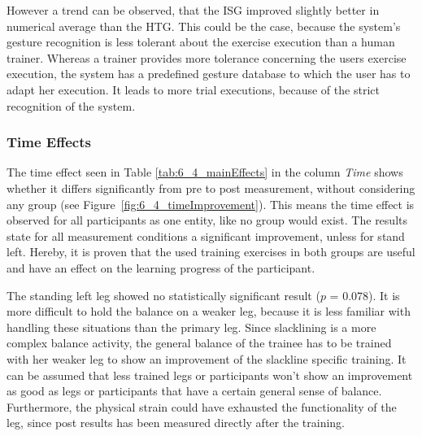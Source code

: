 
However a trend can be observed, that the ISG improved slightly better in numerical average than the HTG.
This could be the case, because the system's gesture recognition is less tolerant about the exercise execution than a human trainer.
Whereas a trainer provides more tolerance concerning the users exercise execution, the system has a predefined gesture database to which the user has to adapt her execution.
It leads to more trial executions, because of the strict recognition of the system.

\subsubsection{Time Effects}
The time effect seen in Table \ref{tab:6_4_mainEffects} in the column \textit{Time} shows whether it differs significantly from pre to post measurement, without considering any group (see Figure~\ref{fig:6_4_timeImprovement}).
This means the time effect is observed for all participants as one entity, like no group would exist.
The results state for all measurement conditions a significant improvement, unless for stand left.
Hereby, it is proven that the used training exercises in both groups are useful and have an effect on the learning progress of the participant.

The standing left leg showed no statistically significant result ($p$ = 0.078).
It is more difficult to hold the balance on a weaker leg, because it is less familiar with handling these situations than the primary leg.
Since slacklining is a more complex balance activity, the general balance of the trainee has to be trained with her weaker leg to show an improvement of the slackline specific training.
It can be assumed that less trained legs or participants won't show an improvement as good as legs or participants that have a certain general sense of balance.
Furthermore, the physical strain could have exhausted the functionality of the leg, since post results has been measured directly after the training.

